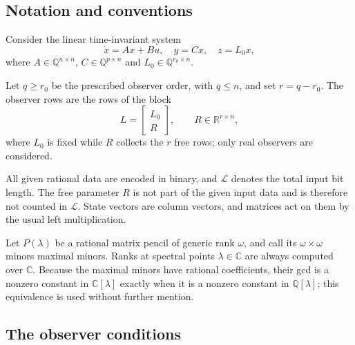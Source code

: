 \documentclass[journal]{IEEEtran}
\theoremstyle{plainn}
\theoremstyle{remark}
\begin{document}
\subsection{Notation and conventions}\label{sec:notation}

Consider the linear time-invariant system
\begin{equation}\label{system}
\dot{x}=Ax+Bu,\quad y=Cx,\quad z=L_0x,
\end{equation}
where $A\in\mathbb Q^{n\times n}$, $C\in\mathbb Q^{p\times n}$ and
$L_0\in\mathbb Q^{r_0\times n}$.

Let $q\ge r_0$ be the prescribed observer order, with $q\le n$, and set $r=q-r_0$. The
observer rows are the rows of the block
\begin{equation*}
L=\begin{bmatrix}L_0\\R\end{bmatrix},\qquad R\in\mathbb R^{r\times n},
\end{equation*}
where $L_0$ is fixed while $R$ collects the $r$ free rows; only real observers are
considered.

All given rational data are encoded in binary, and $\mathcal L$ denotes the total input
bit length. The free parameter $R$ is not part of the given input data and is therefore
not counted in $\mathcal L$. State vectors are column vectors, and matrices act on them by
the usual left multiplication.

Let $P(\lambda)$ be a rational matrix pencil of generic rank $\omega$, and call its
$\omega\times\omega$ minors maximal minors. Ranks at spectral points $\lambda\in\mathbb C$
are always computed over $\mathbb C$. Because the maximal minors have rational
coefficients, their gcd is a nonzero constant in $\mathbb C[\lambda]$ exactly when it is a
nonzero constant in $\mathbb Q[\lambda]$; this equivalence is used without further
mention.

\subsection{The observer conditions}\label{sec:conditions}
\end{document}
